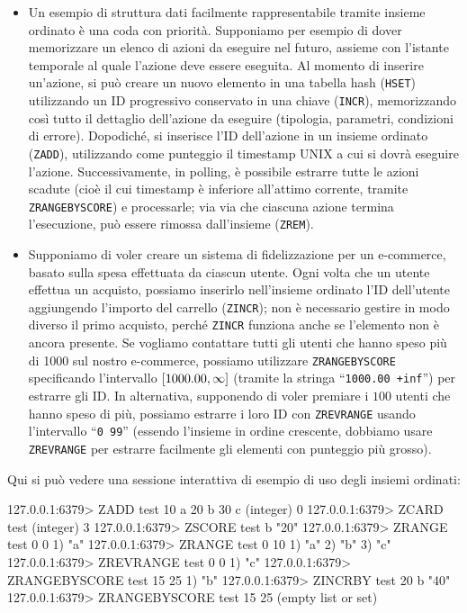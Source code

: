 \begin{itemize}
	\item Un esempio di struttura dati facilmente rappresentabile tramite insieme ordinato è una
	coda con priorità. Supponiamo per esempio di dover memorizzare un elenco di azioni da eseguire
	nel futuro, assieme con l'istante temporale al quale l'azione deve essere eseguita. Al momento
	di inserire un'azione, si può creare un nuovo elemento in una tabella hash (\verb|HSET|)
	utilizzando un ID progressivo conservato in una chiave (\verb|INCR|), memorizzando così tutto
	il dettaglio dell'azione da eseguire (tipologia, parametri, condizioni di errore). Dopodiché,
	si inserisce l'ID dell'azione in un insieme ordinato (\verb|ZADD|), utilizzando come punteggio
	il timestamp UNIX a cui si dovrà eseguire l'azione. Successivamente, in polling, è possibile
	estrarre tutte le azioni scadute (cioè il cui timestamp è inferiore all'attimo corrente,
	tramite \verb|ZRANGEBYSCORE|) e processarle; via via che ciascuna azione termina l'esecuzione,
	può essere rimossa dall'insieme (\verb|ZREM|).

	\item Supponiamo di voler creare un sistema di fidelizzazione per un e-commerce, basato sulla
	spesa effettuata da ciascun utente. Ogni volta che un utente effettua un acquisto, possiamo
	inserirlo nell'insieme ordinato l'ID dell'utente aggiungendo l'importo del carrello
	(\verb|ZINCR|); non è necessario gestire in modo diverso il primo acquisto, perché \verb|ZINCR|
	funziona anche se l'elemento non è ancora presente. Se vogliamo contattare tutti gli utenti che
	hanno speso più di \SI{1000}{\EUR} sul nostro e-commerce, possiamo utilizzare
	\verb|ZRANGEBYSCORE| specificando l'intervallo $\interval{1000.00}{\infty}$ (tramite la stringa
	``\verb|1000.00 +inf|'') per estrarre gli ID. In alternativa, supponendo di voler premiare i
	$100$ utenti che hanno speso di più, possiamo estrarre i loro ID con \verb|ZREVRANGE| usando
	l'intervallo ``\verb|0 99|'' (essendo l'insieme in ordine crescente, dobbiamo usare
	\verb|ZREVRANGE| per estrarre facilmente gli elementi con punteggio più grosso).
\end{itemize}

Qui si può vedere una sessione interattiva di esempio di uso degli insiemi ordinati:

\begin{commentedsource}[style=redis]
127.0.0.1:6379> ZADD test 10 a 20 b 30 c
(integer) 0
127.0.0.1:6379> ZCARD test
(integer) 3
127.0.0.1:6379> ZSCORE test b
"20"
127.0.0.1:6379> ZRANGE test 0 0
1) "a"
127.0.0.1:6379> ZRANGE test 0 10
1) "a"
2) "b"
3) "c"
127.0.0.1:6379> ZREVRANGE test 0 0
1) "c"
127.0.0.1:6379> ZRANGEBYSCORE test 15 25
1) "b"
127.0.0.1:6379> ZINCRBY test 20 b
"40"
127.0.0.1:6379> ZRANGEBYSCORE test 15 25
(empty list or set)
\end{commentedsource}


